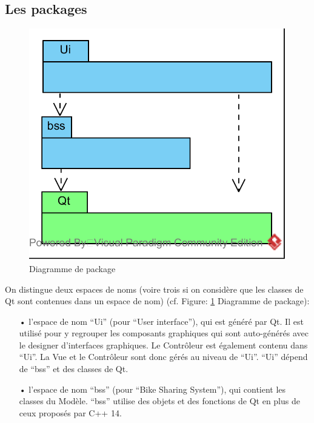 \documentclass[12pt]{article}
\begin{document}
		\subsection{Les packages}
		\begin{figure}[!h]
		\begin{center}
		\includegraphics[scale=1]{dia_package.png}
		\caption{Diagramme de package}
		\label{fig:dia_package}
		\end{center}
		\end{figure}		
		
		On distingue deux espaces de noms (voire trois si on considère que les classes de
		Qt sont contenues dans un espace de nom) (cf. Figure: \ref{fig:dia_package} Diagramme de
		package):\\
	
		\begin{itemize}
		\item[•] l’espace de nom “Ui” (pour “User interface”), qui est généré par Qt.
		Il est utilisé pour y regrouper les composants graphiques qui sont auto-générés avec
		le designer d’interfaces graphiques. Le Contrôleur est également contenu dans “Ui”.
		La Vue et le Contrôleur sont donc gérés au niveau de “Ui”. “Ui” dépend de “bss” et des
		classes de Qt.\\
		
		\item[•]l’espace de nom “bss” (pour “Bike Sharing System”), qui contient les classes
		du Modèle. “bss” utilise des objets et des fonctions de Qt en plus de ceux proposés
		par C++ 14.
		\end{itemize}
\end{document}
